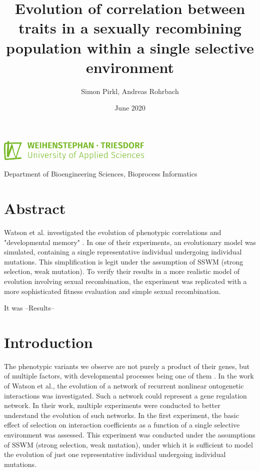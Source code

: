 \documentclass{article}
\title{Evolution of correlation between traits in a sexually recombining population within a single selective environment}
\date{June 2020}
\author{Simon Pirkl, Andreas Rohrbach}
\begin{document}
\maketitle

\begin{center}
	\includegraphics[height=10mm]{./img/ci/HSWT_Logo_gruen.png}

	\vspace{5mm}
	Department of Bioengineering Sciences, Bioprocess Informatics
\end{center}


\tableofcontents
\newpage

\section{Abstract}

Watson et al. investigated the evolution of phenotypic correlations and "developmental memory" \cite{watson2014}. In one of their experiments, an evolutionary model was simulated, containing a single representative individual undergoing individual mutations. This simplification is legit under the assumption of SSWM (strong selection, weak mutation). 
To verify their results in a more realistic model of evolution involving sexual recombination, the experiment was replicated with a more sophisticated fitness evaluation and simple sexual recombination.

It was --Results--

\section{Introduction}

The phenotypic variants we observe are not purely a product of their genes, but of multiple factors, with developmental processes being one of them \cite{laland2015}. In the work of Watson et al., the evolution of a network of recurrent nonlinear ontogenetic interactions was investigated. Such a network could represent a gene regulation network. In their work, multiple experiments were conducted to better understand the evolution of such networks. In the first experiment, the basic effect of selection on interaction coefficients as a function of a single selective environment was assessed. This experiment was conducted under the assumptions of SSWM (strong selection, weak mutation), under which it is sufficient to model the evolution of just one representative individual undergoing individual mutations. 
\end{document}
